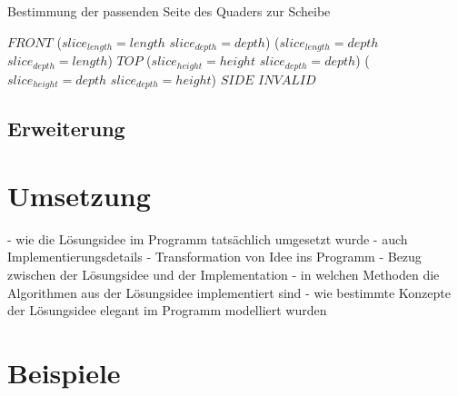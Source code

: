 \documentclass[a4paper,10pt,ngerman]{scrartcl}
\begin{document}
    \begin{algorithm}
        \caption{Bestimmung der passenden Seite des Quaders zur Scheibe}
        \label{alg:cheese2}
        \begin{algorithmic}
                    \State \Return $FRONT$
                \ElsIf
                        {($slice_{length} = length$ \land $slice_{depth} = depth$) \lor ($slice_{length} = depth$ \land $slice_{depth} = length$)}
                    \State \Return $TOP$
                \ElsIf
                        {($slice_{height} = height$ \land $slice_{depth} = depth$) \lor ($slice_{height} = depth$ \land $slice_{depth} = height$)}
                    \State \Return $SIDE$
                \Else
                    \State \Return $INVALID$
                \EndIf
            \EndFunction
        \end{algorithmic}
    \end{algorithm}

    \subsection{Erweiterung}\label{subsec:erweiterung_losungsidee}

    \newpage
    \section{Umsetzung}\label{sec:umsetzung}
    - wie die Lösungsidee im Programm tatsächlich umgesetzt wurde
    - auch Implementierungsdetails
    - Transformation von Idee ins Programm
    - Bezug zwischen der Lösungsidee und der Implementation
    - in welchen Methoden die Algorithmen aus der Lösungsidee implementiert sind
    - wie bestimmte Konzepte der Lösungsidee elegant im Programm modelliert wurden

    \newpage
    \section{Beispiele}\label{sec:beispiele}
\end{document}
